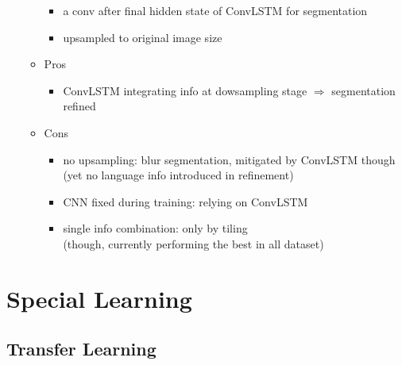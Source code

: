 \begin{itemize}
\begin{itemize}
		\begin{itemize}
		\item a conv after final hidden state of ConvLSTM for segmentation
		\item upsampled to original image size
		\end{itemize}
	\item Pros
		\begin{itemize}
		\item ConvLSTM integrating info at dowsampling stage $\Rightarrow$ segmentation refined
		\end{itemize}
	\item Cons
		\begin{itemize}
		\item no upsampling: blur segmentation, mitigated by ConvLSTM though \\
		(yet no language info introduced in refinement)
		\item CNN fixed during training: relying on ConvLSTM
		\item single info combination: only by tiling \\
		(though, currently performing the best in all dataset)
		\end{itemize}
	\end{itemize}
\end{itemize}


\section{Special Learning}
\subsection{Transfer Learning} \label{DL_Learning_Transfer}
